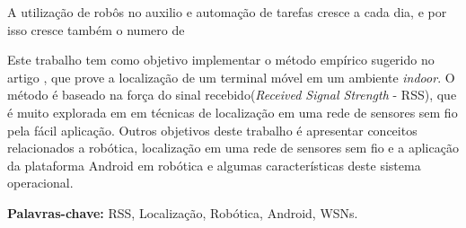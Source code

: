   A utilização de robôs no auxilio e automação de tarefas cresce a cada dia, e por isso 
  cresce também o numero de

  Este trabalho tem como objetivo implementar o método empírico sugerido no artigo \cite{wifiRadar},
  que prove a localização de um terminal móvel em um ambiente \textit{indoor}. 
  O método é baseado na força do 
  sinal recebido(\textit{Received Signal Strength} - RSS), que é muito explorada em
  em técnicas de localização em uma rede de sensores sem fio pela fácil aplicação. Outros objetivos 
  deste trabalho é apresentar conceitos relacionados a robótica, localização 
  em uma rede de sensores sem fio e a aplicação da plataforma Android em robótica e 
  algumas características deste sistema operacional.
  
\textbf{Palavras-chave:} RSS, Localização, Robótica, Android, WSNs.